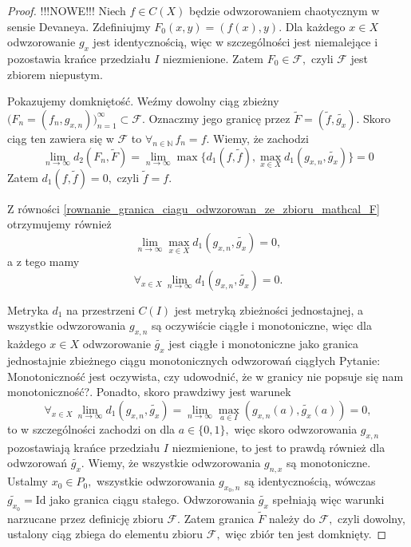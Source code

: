 \documentclass[licencjacka]{pwr_wmat_praca_dyplomowa}
\theoremstyle{plain}
\numberwithin{theorem}{chapter}
\theoremstyle{definition}
\numberwithin{theorem}{chapter}
\begin{document}
\begin{proof}
{\color{red} !!!NOWE!!!
Niech $f \in C(X)$ będzie odwzorowaniem chaotycznym w sensie Devaneya. Zdefiniujmy $F_0(x,y) = (f(x), y).$ Dla każdego $x \in X$ odwzorowanie $g_x$ jest identycznością, więc w szczególności jest niemalejące i pozostawia krańce przedziału $I$ niezmienione. Zatem $F_0 \in \mathcal{F},$ czyli $\mathcal{F}$ jest zbiorem niepustym.

Pokazujemy domkniętość. Weźmy dowolny ciąg zbieżny $\big(F_n=(f_n, g_{x,n})\big)_{n=1}^{\infty} \subset \mathcal{F}.$ Oznaczmy jego granicę przez $\widetilde{F}=(\widetilde{f}, \widetilde{g_x}).$
Skoro ciąg ten zawiera się w $\mathcal{F}$ to $\forall_{n \in \mathbb{N}} \, f_n = f.$ Wiemy, że zachodzi 
\begin{equation}
\label{rownanie_granica_ciagu_odwzorowan_ze_zbioru_mathcal_F}
\lim_{n \rightarrow \infty} d_2(F_n, \widetilde{F}) = \lim_{n \rightarrow \infty} \max\{d_1(f, \widetilde{f}), \max_{x \in X} d_1(g_{x,n}, \widetilde{g_x})\} = 0
\end{equation}
Zatem $d_1(f, \widetilde{f}) = 0,$ czyli $\widetilde{f} = f.$

Z równości \ref{rownanie_granica_ciagu_odwzorowan_ze_zbioru_mathcal_F} otrzymujemy również 
$$\lim_{n \rightarrow \infty} \max_{x \in X} d_1(g_{x,n}, \widetilde{g_x}) = 0,$$
a z tego mamy 
$$\forall_{x \in X} \, \lim_{n \rightarrow \infty} d_1(g_{x,n}, \widetilde{g_x}) = 0.$$

Metryka $d_1$ na przestrzeni $C(I)$ jest metryką zbieżności jednostajnej, a wszystkie odwzorowania $g_{x,n}$ są oczywiście ciągłe i monotoniczne, więc dla każdego $x \in X$ odwzorowanie $\widetilde{g_x}$ jest ciągłe i monotoniczne jako granica jednostajnie zbieżnego ciągu monotonicznych odwzorowań ciągłych {\color{blue} Pytanie: Monotoniczność jest oczywista, czy udowodnić, że w granicy nie popsuje się nam monotoniczność?}.
Ponadto, skoro prawdziwy jest warunek 
$$\forall_{x \in X} \, \lim_{n \rightarrow \infty} d_1(g_{x,n}, \widetilde{g_x}) = \lim_{n \rightarrow \infty} \max_{a \in I}(g_{x,n}(a), \widetilde{g_x}(a)) = 0,$$
to w szczególności zachodzi on dla $a \in \{0, 1\},$ więc skoro odwzorowania $g_{x,n}$ pozostawiają krańce przedziału $I$ niezmienione, to jest to prawdą również dla odwzorowań $\widetilde{g_x}.$ Wiemy, że wszystkie odwzorowania $g_{n,x}$ są monotoniczne. Ustalmy $x_0 \in P_0,$ wszystkie odwzorowania $g_{x_0,n}$ są identycznością, wówczas $\widetilde{g_{x_0}} = \textrm{Id}$ jako granica ciągu stałego. Odwzorowania $\widetilde{g_x}$ spełniają więc warunki narzucane przez definicję zbioru $\mathcal{F}.$
Zatem granica $\widetilde{F}$ należy do $\mathcal{F},$ czyli dowolny, ustalony ciąg zbiega do elementu zbioru $\mathcal{F},$ więc zbiór ten jest domknięty.
}
\end{proof}
\end{document}
